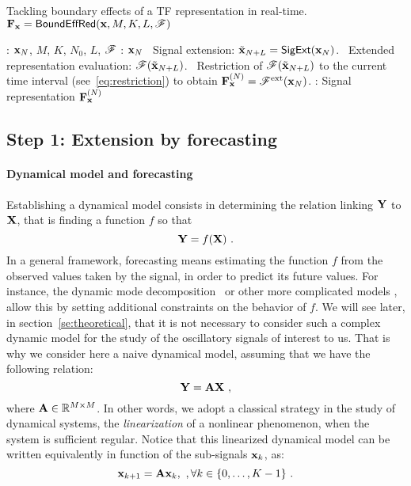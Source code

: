 \begin{algorithm}
\caption{Tackling boundary effects of a TF representation in real-time. ${\mathbf F}_{\mathbf x} = \relax{\sf BoundEffRed}({\mathbf x},M,K,L,{\mathscr F})$}
\label{alg:boundary}
\begin{algorithmic}
: ${\mathbf x}_{N}$, $M$, $K$, $N_0$, $L$, ${\mathscr F}$
\STATE
{}
: ${\mathbf x}_N$
\STATE
{}
\STATE \quad\textbullet\ Signal extension: $\tilde{{\mathbf x}}_{N+L} = \relax{\sf SigExt}({\mathbf x}_N)$. 
\STATE \quad\textbullet\ Extended representation evaluation: ${\mathscr F}(\tilde{{\mathbf x}}_{N+L})$.
\STATE \quad\textbullet\ Restriction of ${\mathscr F}(\tilde{{\mathbf x}}_{N+L})$ to the current time interval (see~\eqref{eq:restriction}) to obtain ${\mathbf F}_{\mathbf x}^{(N)}={\mathscr F}^{\mathrm{ext}}({\mathbf x}_N)$.
\STATE
{}: Signal representation ${\mathbf F}_{\mathbf x}^{(N)}$
\ENDWHILE
\end{algorithmic}
\end{algorithm}


\subsection{Step 1: Extension by forecasting}




\paragraph{Dynamical model and forecasting} 
Establishing a dynamical model consists in determining the relation linking ${\mathbf Y}$ to ${\mathbf X}$, that is finding a function $f$ so that
\[
{\mathbf Y} = f({\mathbf X})\ .
\]
In a general framework, forecasting means estimating the function $f$ from the observed values taken by the signal, in order to predict its future values. For instance, the dynamic mode decomposition~\cite{Schmid10dynamic,Williams15data} or other more complicated models \cite{Roberts13Gaussian,DeLivera11forecasting,west2006bayesian,vlachas2018data}, allow this by setting additional constraints on the behavior of $f$. We will see later, in section~\ref{se:theoretical}, that it is not necessary to consider such a complex dynamic model for the study of the oscillatory signals of interest to us. That is why we consider here a naive dynamical model, assuming that we have the following relation:
\begin{equation}
\bY = \bA\bX\ ,
\label{eq:dyn.model}
\end{equation}
where ${\mathbf A}\in{\mathbb R}^{M\times M}$. In other words, we adopt a classical strategy in the study of dynamical systems, the {\em linearization} of a nonlinear phenomenon, when the system is sufficient regular. Notice that this linearized dynamical model can be written equivalently in function of the sub-signals ${\mathbf x}_k$, as:
\begin{equation}
{\mathbf x}_{k+1} = {\mathbf A}{\mathbf x}_{k},\ ,\forall k\in\{0,\dots,K-1\}\ .
\end{equation}


